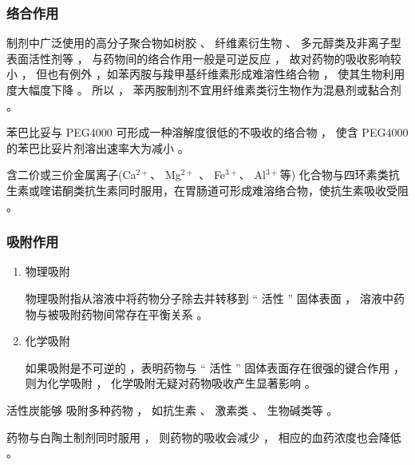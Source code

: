 \begin{frame}
    \frametitle{络合作用}
    \begin{blankblock}{}
        制剂中广泛使用的高分子聚合物如树胶 、 纤维素衍生物 、 多元醇类及非离子型表面活性剂等 ， 与药物间的络合作用一般是可逆反应 ， 故对药物的吸收影响较小 ， 但也有例外 ，如苯丙胺与羧甲基纤维素形成难溶性络合物 ， 使其生物利用度大幅度下降 。 所以 ， 苯丙胺制剂不宜用纤维素类衍生物作为混悬剂或黏合剂 。 
    \end{blankblock}

    \begin{blankblock}{}
        苯巴比妥与 PEG4000 可形成一种溶解度很低的不吸收的络合物 ， 使含 PEG4000 的苯巴比妥片剂溶出速率大为减小 。
    \end{blankblock}

    \begin{blankblock}{}
        含二价或三价金属离子(Ca$^{2+}$、 Mg$^{2+}$ 、 Fe$^{3+}$、 Al$^{3+}$等) 化合物与四环素类抗生素或喹诺酮类抗生素同时服用，在胃肠道可形成难溶络合物，使抗生素吸收受阻 。 
    \end{blankblock}
\end{frame}


\begin{frame}
    \frametitle{吸附作用}
    \begin{enumerate}
      \item 物理吸附
      
      物理吸附指从溶液中将药物分子除去并转移到 “ 活性 ” 固体表面 ， 溶液中药物与被吸附药物间常存在平衡关系 。 
      \item 化学吸附
      
      如果吸附是不可逆的 ，表明药物与 “ 活性 ” 固体表面存在很强的键合作用 ， 则为化学吸附 ， 化学吸附无疑对药物吸收产生显著影响 。 
    \end{enumerate}
    
    \begin{blankblock}{}
        活性炭能够    吸附多种药物 ， 如抗生素 、 激素类 、 生物碱类等 。 
        
        药物与白陶土制剂同时服用 ， 则药物的吸收会减少 ， 相应的血药浓度也会降低 。
    \end{blankblock}
\end{frame}




